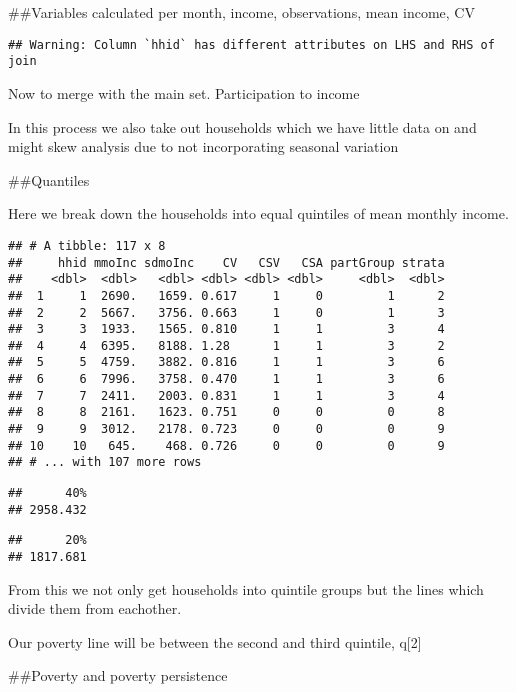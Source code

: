 \documentclass[
]{article}
\begin{document}
\#\#Variables calculated per month, income, observations, mean income,
CV

\begin{verbatim}
## Warning: Column `hhid` has different attributes on LHS and RHS of join
\end{verbatim}

Now to merge with the main set. Participation to income

In this process we also take out households which we have little data on
and might skew analysis due to not incorporating seasonal variation

\#\#Quantiles

Here we break down the households into equal quintiles of mean monthly
income.

\begin{verbatim}
## # A tibble: 117 x 8
##     hhid mmoInc sdmoInc    CV   CSV   CSA partGroup strata
##    <dbl>  <dbl>   <dbl> <dbl> <dbl> <dbl>     <dbl>  <dbl>
##  1     1  2690.   1659. 0.617     1     0         1      2
##  2     2  5667.   3756. 0.663     1     0         1      3
##  3     3  1933.   1565. 0.810     1     1         3      4
##  4     4  6395.   8188. 1.28      1     1         3      2
##  5     5  4759.   3882. 0.816     1     1         3      6
##  6     6  7996.   3758. 0.470     1     1         3      6
##  7     7  2411.   2003. 0.831     1     1         3      4
##  8     8  2161.   1623. 0.751     0     0         0      8
##  9     9  3012.   2178. 0.723     0     0         0      9
## 10    10   645.    468. 0.726     0     0         0      9
## # ... with 107 more rows
\end{verbatim}

\begin{verbatim}
##      40% 
## 2958.432
\end{verbatim}

\begin{verbatim}
##      20% 
## 1817.681
\end{verbatim}

From this we not only get households into quintile groups but the lines
which divide them from eachother.

Our poverty line will be between the second and third quintile, q{[}2{]}

\#\#Poverty and poverty persistence
\end{document}
